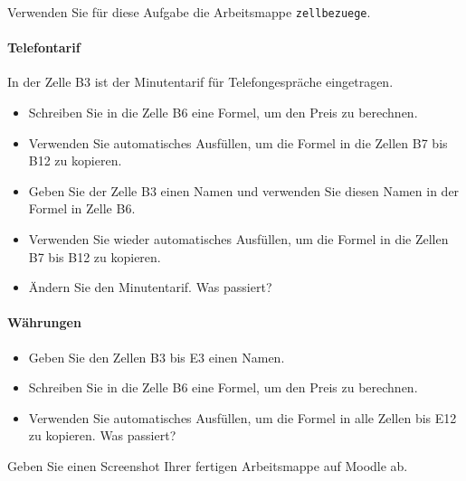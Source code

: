 \begin{myexercise}[Zellbezüge]
    Verwenden Sie für diese Aufgabe die Arbeitsmappe \texttt{zellbezuege}.

    \paragraph*{Telefontarif}
    In der Zelle B3 ist der Minutentarif für Telefongespräche eingetragen.
    \begin{itemize}
        \item Schreiben Sie in die Zelle B6 eine Formel, um den Preis zu berechnen.
        \item Verwenden Sie automatisches Ausfüllen, um die Formel in die Zellen B7 bis B12 zu kopieren.
        \item Geben Sie der Zelle B3 einen Namen und verwenden Sie diesen Namen in der Formel in Zelle B6.
        \item Verwenden Sie wieder automatisches Ausfüllen, um die Formel in die Zellen B7 bis B12 zu kopieren.
        \item Ändern Sie den Minutentarif. Was passiert?
    \end{itemize}

    \paragraph*{Währungen}
    \begin{itemize}
        \item Geben Sie den Zellen B3 bis E3 einen Namen.
        \item Schreiben Sie in die Zelle B6 eine Formel, um den Preis zu berechnen.
        \item Verwenden Sie automatisches Ausfüllen, um die Formel in alle Zellen bis E12 zu kopieren. Was passiert?
    \end{itemize}
    Geben Sie einen Screenshot Ihrer fertigen Arbeitsmappe auf Moodle ab.
\end{myexercise}

